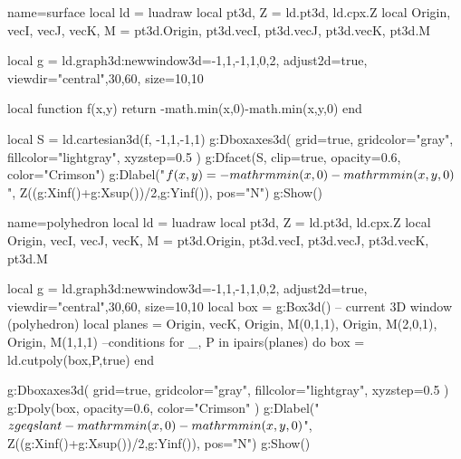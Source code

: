 \documentclass[border=5pt]{standalone}%
\def\shortcuts{%
local ld = luadraw
local pt3d, Z = ld.pt3d, ld.cpx.Z
local Origin, vecI, vecJ, vecK, M = pt3d.Origin, pt3d.vecI, pt3d.vecJ, pt3d.vecK, pt3d.M
}%
\begin{document}
\begin{luadraw}{name=surface}
\shortcuts
local g = ld.graph3d:new{window3d={-1,1,-1,1,0,2}, adjust2d=true, viewdir={"central",30,60}, size={10,10}}

local function f(x,y)
    return -math.min(x,0)-math.min(x,y,0)
end

local S = ld.cartesian3d(f, -1,1,-1,1)
g:Dboxaxes3d( {grid=true, gridcolor="gray", fillcolor="lightgray", xyzstep=0.5} )
g:Dfacet(S, {clip=true, opacity=0.6, color="Crimson"})
g:Dlabel("$f(x,y)=-\\mathrm{min}(x,0)-\\mathrm{min(x,y,0)}$", 
    Z((g:Xinf()+g:Xsup())/2,g:Yinf()), {pos="N"})
g:Show()
\end{luadraw}

\begin{luadraw}{name=polyhedron}
\shortcuts
local g = ld.graph3d:new{window3d={-1,1,-1,1,0,2}, adjust2d=true, viewdir={"central",30,60}, size={10,10}}
local box = g:Box3d() -- current 3D window (polyhedron)
local planes = { {Origin, vecK}, {Origin, M(0,1,1)}, {Origin, M(2,0,1)}, {Origin, M(1,1,1)} } --conditions
for _, P in ipairs(planes) do box = ld.cutpoly(box,P,true) end

g:Dboxaxes3d( {grid=true, gridcolor="gray", fillcolor="lightgray", xyzstep=0.5} )
g:Dpoly(box, {opacity=0.6, color="Crimson"} )
g:Dlabel("$z \\geqslant-\\mathrm{min}(x,0)-\\mathrm{min(x,y,0)}$", 
    Z((g:Xinf()+g:Xsup())/2,g:Yinf()), {pos="N"})
g:Show()
\end{luadraw}
\end{document}
